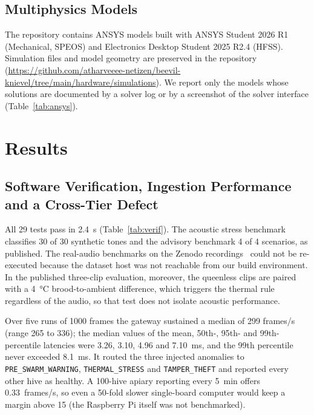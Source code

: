 \documentclass[conference]{IEEEtran}
\begin{document}
\subsection{Multiphysics Models}\label{sec:m-sim}
The repository contains ANSYS models built with ANSYS Student 2026 R1 (Mechanical, SPEOS) and Electronics Desktop Student 2025 R2.4 (HFSS). Simulation files and model geometry are preserved in the repository (\url{https://github.com/atharveeee-netizen/beevil-knievel/tree/main/hardware/simulations}). We report only the models whose solutions are documented by a solver log or by a screenshot of the solver interface (Table~\ref{tab:ansys}).

\section{Results}\label{sec:results}
\subsection{Software Verification, Ingestion Performance and a Cross-Tier Defect}\label{sec:r-sw}
All 29 tests pass in \SI{2.4}{s} (Table~\ref{tab:verif}). The acoustic stress benchmark classifies 30 of 30 synthetic tones and the advisory benchmark 4 of 4 scenarios, as published. The real-audio benchmarks on the Zenodo recordings~\cite{nolasco2018data} could not be re-executed because the dataset host was not reachable from our build environment. In the published three-clip evaluation, moreover, the queenless clips are paired with a \SI{4}{\celsius} brood-to-ambient difference, which triggers the thermal rule regardless of the audio, so that test does not isolate acoustic performance.

Over five runs of 1000 frames the gateway sustained a median of 299 frames/s (range 265 to 336); the median values of the mean, 50th-, 95th- and 99th-percentile latencies were 3.26, 3.10, 4.96 and \SI{7.10}{ms}, and the 99th percentile never exceeded \SI{8.1}{ms}. It routed the three injected anomalies to \texttt{PRE\_SWARM\_WARNING}, \texttt{THERMAL\_STRESS} and \texttt{TAMPER\_THEFT} and reported every other hive as healthy. A 100-hive apiary reporting every \SI{5}{min} offers \SI{0.33}{frames/s}, so even a 50-fold slower single-board computer would keep a margin above 15 (the Raspberry Pi itself was not benchmarked).
\end{document}

